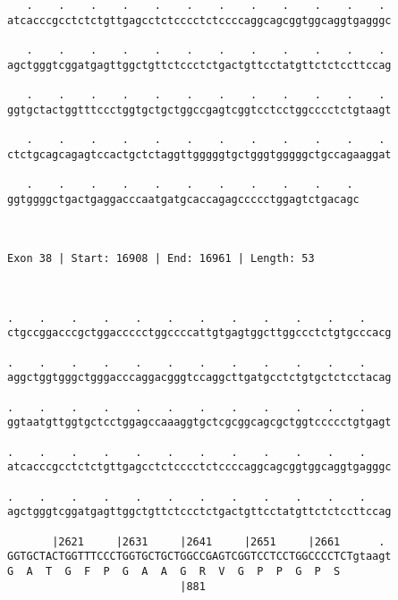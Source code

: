 \documentclass{article}
\begin{document}
\begin{Verbatim}
   .    .    .    .    .    .    .    .    .    .    .    . 
atcacccgcctctctgttgagcctctcccctctccccaggcagcggtggcaggtgagggc
                                                            
   .    .    .    .    .    .    .    .    .    .    .    . 
agctgggtcggatgagttggctgttctccctctgactgttcctatgttctctccttccag
                                                            
   .    .    .    .    .    .    .    .    .    .    .    . 
ggtgctactggtttccctggtgctgctggccgagtcggtcctcctggcccctctgtaagt
                                                            
   .    .    .    .    .    .    .    .    .    .    .    . 
ctctgcagcagagtccactgctctaggttgggggtgctgggtgggggctgccagaaggat
                                                            
   .    .    .    .    .    .    .    .    .    .    . 
ggtggggctgactgaggacccaatgatgcaccagagccccctggagtctgacagc
                                                       
                                                       
 
Exon 38 | Start: 16908 | End: 16961 | Length: 53



.    .    .    .    .    .    .    .    .    .    .    .    
ctgccggacccgctggaccccctggccccattgtgagtggcttggccctctgtgcccacg
                                                            
.    .    .    .    .    .    .    .    .    .    .    .    
aggctggtgggctgggacccaggacgggtccaggcttgatgcctctgtgctctcctacag
                                                            
.    .    .    .    .    .    .    .    .    .    .    .    
ggtaatgttggtgctcctggagccaaaggtgctcgcggcagcgctggtccccctgtgagt
                                                            
.    .    .    .    .    .    .    .    .    .    .    .    
atcacccgcctctctgttgagcctctcccctctccccaggcagcggtggcaggtgagggc
                                                            
.    .    .    .    .    .    .    .    .    .    .    .    
agctgggtcggatgagttggctgttctccctctgactgttcctatgttctctccttccag
                                                            
       |2621     |2631     |2641     |2651     |2661      . 
GGTGCTACTGGTTTCCCTGGTGCTGCTGGCCGAGTCGGTCCTCCTGGCCCCTCTgtaagt
G  A  T  G  F  P  G  A  A  G  R  V  G  P  P  G  P  S        
                           |881                             
  

\end{Verbatim}
\end{document}
